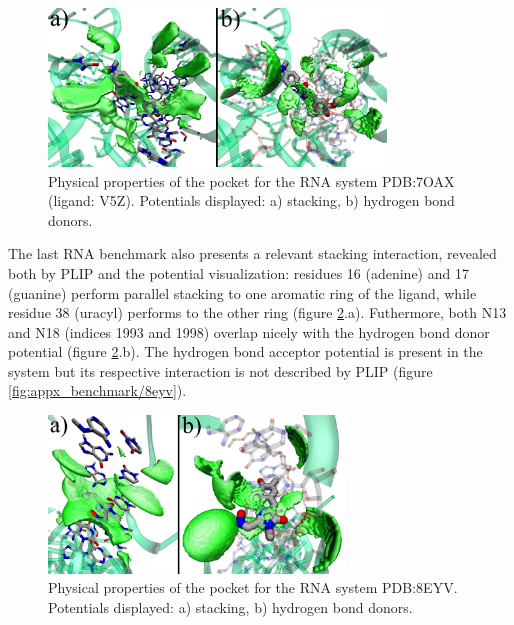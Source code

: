     \begin{figure}[H]
      \centering
      \includegraphics[width=0.8\textwidth]{figures/results/benchmark_rna/7oax1.png}
      \caption{\label{fig:benchmark/7oax1} Physical properties of the pocket for the RNA system PDB:7OAX (ligand: V5Z). Potentials displayed: a) stacking, b) hydrogen bond donors.}
    \end{figure}

    The last RNA benchmark also presents a relevant stacking interaction, revealed both by PLIP and the potential visualization: residues 16 (adenine) and 17 (guanine) perform parallel stacking to one aromatic ring of the ligand, while residue 38 (uracyl) performs to the other ring (figure \ref{fig:benchmark/8eyv}.a). Futhermore, both N13 and N18 (indices 1993 and 1998) overlap nicely with the hydrogen bond donor potential (figure \ref{fig:benchmark/8eyv}.b). The hydrogen bond acceptor potential is present in the system but its respective interaction is not described by PLIP (figure \ref{fig:appx_benchmark/8eyv}).

    \begin{figure}[H]
      \centering
      \includegraphics[width=0.7\textwidth]{figures/results/benchmark_rna/8eyv.png}
      \caption{\label{fig:benchmark/8eyv} Physical properties of the pocket for the RNA system PDB:8EYV. Potentials displayed: a) stacking, b) hydrogen bond donors.}
    \end{figure}


